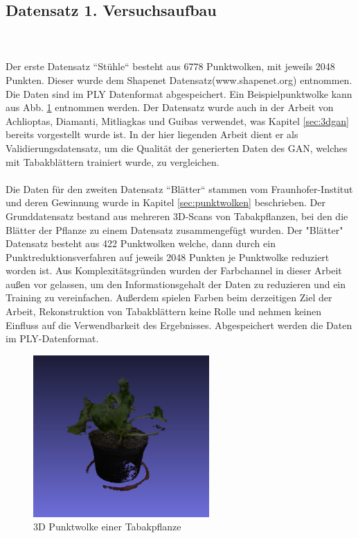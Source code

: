 \documentclass{llncs}
\begin{document}
\subsection{Datensatz 1. Versuchsaufbau}\label{sec:versuch1-traingsdaten}
~\\\\
Der erste Datensatz ``Stühle`` besteht aus 6778 Punktwolken, mit jeweils 2048 Punkten. Dieser wurde dem Shapenet Datensatz(www.shapenet.org) entnommen. Die Daten sind im PLY Datenformat abgespeichert. Ein Beispielpunktwolke kann aus Abb. \ref{fig:Bild50} entnommen werden. Der Datensatz wurde auch in der Arbeit von Achlioptas, Diamanti, Mitliagkas und Guibas\cite{3dgan} verwendet, was Kapitel \ref{sec:3dgan} bereits vorgestellt wurde ist. In der hier liegenden Arbeit dient er als Validierungsdatensatz, um die Qualität der generierten Daten des GAN, welches mit Tabakblättern trainiert wurde, zu vergleichen.
\\\\
Die Daten für den zweiten Datensatz ``Blätter`` stammen vom Fraunhofer-Institut und deren Gewinnung wurde in Kapitel \ref{sec:punktwolken} beschrieben. Der Grunddatensatz bestand aus mehreren 3D-Scans von Tabakpflanzen, bei den die Blätter der Pflanze zu einem Datensatz zusammengefügt wurden. Der "Blätter" Datensatz besteht aus 422 Punktwolken welche, dann durch ein Punktreduktionsverfahren auf jeweils 2048 Punkten je Punktwolke reduziert worden ist. Aus Komplexitätsgründen wurden der Farbchannel in dieser Arbeit außen vor gelassen, um den Informationsgehalt der Daten zu reduzieren und ein Training zu vereinfachen. Außerdem spielen Farben beim derzeitigen Ziel der Arbeit, Rekonstruktion von Tabakblättern keine Rolle und nehmen keinen Einfluss auf die Verwendbarkeit des Ergebnisses. Abgespeichert werden die Daten im PLY-Datenformat.

\begin{figure}[htbp] 
	\centering
	\includegraphics[width=0.6\textwidth]{plant.png}
	\caption{3D Punktwolke einer Tabakpflanze}
	\label{fig:Bild50}
\end{figure}
\end{document}
